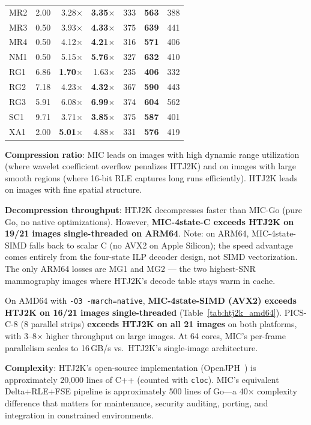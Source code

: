 \documentclass[10pt,twocolumn]{article}
\begin{document}
\begin{table}[t]
\begin{tabular}{lrrrrrr}
    MR2 & 2.00 & 3.28$\times$ & \textbf{3.35$\times$} & 333 & \textbf{563} & 388 \\
    MR3 & 0.50 & 3.93$\times$ & \textbf{4.33$\times$} & 375 & \textbf{639} & 441 \\
    MR4 & 0.50 & 4.12$\times$ & \textbf{4.21$\times$} & 316 & \textbf{571} & 406 \\
    NM1 & 0.50 & 5.15$\times$ & \textbf{5.76$\times$} & 327 & \textbf{632} & 410 \\
    RG1 & 6.86 & \textbf{1.70$\times$} & 1.63$\times$ & 235 & \textbf{406} & 332 \\
    RG2 & 7.18 & 4.23$\times$ & \textbf{4.32$\times$} & 367 & \textbf{590} & 443 \\
    RG3 & 5.91 & 6.08$\times$ & \textbf{6.99$\times$} & 374 & \textbf{604} & 562 \\
    SC1 & 9.71 & 3.71$\times$ & \textbf{3.85$\times$} & 375 & \textbf{587} & 401 \\
    XA1 & 2.00 & \textbf{5.01$\times$} & 4.88$\times$ & 331 & \textbf{576} & 419 \\
    \bottomrule
  \end{tabular}
\end{table}

\textbf{Compression ratio}: MIC leads on images with high dynamic range utilization (where wavelet coefficient overflow penalizes HTJ2K) and on images with large smooth regions (where 16-bit RLE captures long runs efficiently). HTJ2K leads on images with fine spatial structure.

\textbf{Decompression throughput}: HTJ2K decompresses faster than MIC-Go (pure Go, no native optimizations). However, \textbf{MIC-4state-C exceeds HTJ2K on 19/21 images single-threaded on ARM64}. Note: on ARM64, MIC-4state-SIMD falls back to scalar C (no AVX2 on Apple Silicon); the speed advantage comes entirely from the four-state ILP decoder design, not SIMD vectorization. The only ARM64 losses are MG1 and MG2 --- the two highest-SNR mammography images where HTJ2K's decode table stays warm in cache.

On AMD64 with \texttt{-O3 -march=native}, \textbf{MIC-4state-SIMD (AVX2) exceeds HTJ2K on 16/21 images single-threaded} (Table~\ref{tab:htj2k_amd64}). PICS-C-8 (8 parallel strips) \textbf{exceeds HTJ2K on all 21 images} on both platforms, with 3--8$\times$ higher throughput on large images. At 64 cores, MIC's per-frame parallelism scales to 16\,GB/s vs.\ HTJ2K's single-image architecture.

\textbf{Complexity}: HTJ2K's open-source implementation (OpenJPH~\cite{openjph}) is approximately 20,000 lines of C++ (counted with \texttt{cloc}). MIC's equivalent Delta+RLE+FSE pipeline is approximately 500 lines of Go---a 40$\times$ complexity difference that matters for maintenance, security auditing, porting, and integration in constrained environments.
\end{document}
